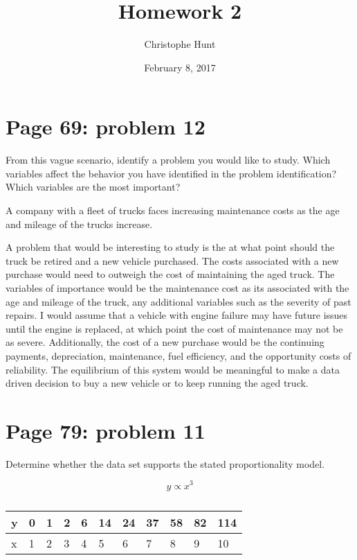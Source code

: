 \documentclass[]{article}
\title{Homework 2}
\author{Christophe Hunt}
\date{February 8, 2017}
\begin{document}
\maketitle

{
\setcounter{tocdepth}{2}
\tableofcontents
}
\section{Page 69: problem 12}\label{page-69-problem-12}

From this vague scenario, identify a problem you would like to study.
Which variables affect the behavior you have identified in the problem
identification? Which variables are the most important?

A company with a fleet of trucks faces increasing maintenance costs as
the age and mileage of the trucks increase.

A problem that would be interesting to study is the at what point should
the truck be retired and a new vehicle purchased. The costs associated
with a new purchase would need to outweigh the cost of maintaining the
aged truck. The variables of importance would be the maintenance cost as
its associated with the age and mileage of the truck, any additional
variables such as the severity of past repairs. I would assume that a
vehicle with engine failure may have future issues until the engine is
replaced, at which point the cost of maintenance may not be as severe.
Additionally, the cost of a new purchase would be the continuing
payments, depreciation, maintenance, fuel efficiency, and the
opportunity costs of reliability. The equilibrium of this system would
be meaningful to make a data driven decision to buy a new vehicle or to
keep running the aged truck.

\section{Page 79: problem 11}\label{page-79-problem-11}

Determine whether the data set supports the stated proportionality
model.

\[y \propto x^3\]

\begin{table}[!htbp]
\centering
\caption{}
\label{my-label}
\begin{tabular}{l|llllllllll}
y & 0 & 1 & 2 & 6 & 14 & 24 & 37 & 58 & 82 & 114 \\ \hline
x & 1 & 2 & 3 & 4 & 5 & 6 & 7 & 8 & 9 & 10
\end{tabular}
\end{table}
\end{document}
